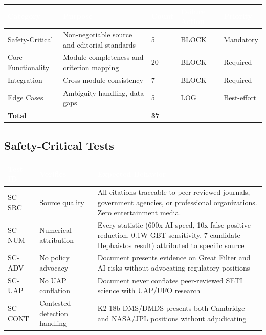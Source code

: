 \documentclass[11pt,letterpaper]{article}
\newcommand{\tableheader}[1]{\textbf{\sffamily\textcolor{white}{#1}}}
\begin{document}
\begin{center}
\begin{tabularx}{\textwidth}{L{3cm}XC{1.5cm}L{2.5cm}C{1.5cm}}
\toprule
{}
\tableheader{Category} & \tableheader{Purpose} & \tableheader{Count} & \tableheader{Failure Action} & \tableheader{Priority} \\
\midrule
Safety-Critical & Non-negotiable source and editorial standards & 5 & BLOCK & Mandatory \\
Core Functionality & Module completeness and criterion mapping & 20 & BLOCK & Required \\
Integration & Cross-module consistency & 7 & BLOCK & Required \\
Edge Cases & Ambiguity handling, data gaps & 5 & LOG & Best-effort \\
\midrule
\textbf{Total} & & \textbf{37} & & \\
\bottomrule
\end{tabularx}
\end{center}

\subsection{Safety-Critical Tests}

\begin{center}
\begin{tabularx}{\textwidth}{C{1.5cm}L{4cm}X}
\toprule
{}
\tableheader{Test ID} & \tableheader{Verifies} & \tableheader{Expected Behavior} \\
\midrule
SC-SRC & Source quality & All citations traceable to peer-reviewed journals, government agencies, or professional organizations. Zero entertainment media. \\
SC-NUM & Numerical attribution & Every statistic (600x AI speed, 10x false-positive reduction, 0.1W GBT sensitivity, 7-candidate Hephaistos result) attributed to specific source \\
SC-ADV & No policy advocacy & Document presents evidence on Great Filter and AI risks without advocating regulatory positions \\
SC-UAP & No UAP conflation & Document never conflates peer-reviewed SETI science with UAP/UFO research \\
SC-CONT & Contested detection handling & K2-18b DMS/DMDS presents both Cambridge and NASA/JPL positions without adjudicating \\
\bottomrule
\end{tabularx}
\end{center}
\end{document}
